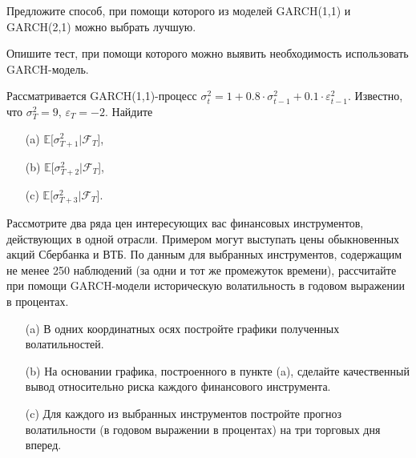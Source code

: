 \begin{solution}
\end{solution}



\begin{problem}
Предложите способ, при помощи которого из моделей GARCH(1,1) и GARCH(2,1) можно выбрать лучшую.
\end{problem}

\begin{solution}
\end{solution}

\begin{problem}
Опишите тест, при помощи которого можно выявить необходимость использовать GARCH-модель.
\end{problem}

\begin{solution}
\end{solution}



\begin{problem}
Рассматривается GARCH(1,1)-процесс $\sigma_t^2 = 1 + 0.8 \cdot \sigma_{t-1}^2 + 0.1 \cdot \varepsilon_{t-1}^2$. Известно, что $\sigma_T^2 = 9$, $\varepsilon_T = -2$. Найдите
\begin{itemize}
  \item[(a)] $\mathbb{E}[\sigma_{T+1}^2|\mathcal{F}_T$],
  \item[(b)] $\mathbb{E}[\sigma_{T+2}^2|\mathcal{F}_T$],
  \item[(c)] $\mathbb{E}[\sigma_{T+3}^2|\mathcal{F}_T$].
\end{itemize}
\end{problem}

\begin{solution}
\end{solution}


\begin{problem}
Рассмотрите два ряда цен интересующих вас финансовых инструментов, действующих в одной отрасли. Примером могут выступать цены обыкновенных акций Сбербанка и ВТБ. По данным для выбранных инструментов, содержащим не менее 250 наблюдений (за одни и тот же промежуток времени), рассчитайте при помощи GARCH-модели историческую волатильность в годовом выражении в процентах.
\begin{itemize}
  \item[(a)] В одних координатных осях постройте графики полученных волатильностей.
  \item[(b)] На основании графика, построенного в пункте (a), сделайте качественный вывод относительно риска каждого финансового инструмента.
  \item[(c)] Для каждого из выбранных инструментов постройте прогноз волатильности (в годовом выражении в процентах) на три торговых дня вперед.
\end{itemize}
\end{problem}

